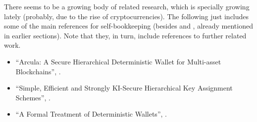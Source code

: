 There seems to be a growing body of related research, which is specially
growing lately (probably, due to the rise of cryptocurrencies). The following
just includes some of the main references for self-bookkeeping (besides
\cite{kkl20} and \cite{def+21}, already mentioned in earlier sections). Note
that they, in turn, include references to further related work.

\begin{itemize}
\item ``Arcula: A Secure Hierarchical Deterministic Wallet for Multi-asset
  Blockchains'', \cite{lfa20}.
\item ``Simple, Efficient and Strongly KI-Secure Hierarchical Key Assignment
  Schemes'', \cite{fpp13}.
\item ``A Formal Treatment of Deterministic Wallets'', \cite{dfl19}.
\end{itemize}

